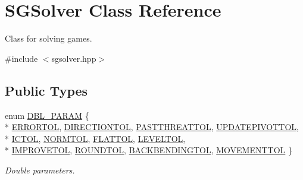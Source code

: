 \hypertarget{class_s_g_solver}{\section{S\+G\+Solver Class Reference}
\label{class_s_g_solver}
}


Class for solving games.  




{\ttfamily \#include $<$sgsolver.\+hpp$>$}

\subsection*{Public Types}
\begin{DoxyCompactItemize}
\item 
enum \hyperlink{class_s_g_solver_a8c5a3d3ffb0b8344e24da63ea0b3e791}{D\+B\+L\+\_\+\+P\+A\+R\+A\+M} \{ \\*
\hyperlink{class_s_g_solver_a8c5a3d3ffb0b8344e24da63ea0b3e791aa95cd65c0e0c61f23336299c31c21e23}{E\+R\+R\+O\+R\+T\+O\+L}, 
\hyperlink{class_s_g_solver_a8c5a3d3ffb0b8344e24da63ea0b3e791afb966ddafded880b3a150ffbf665c0b9}{D\+I\+R\+E\+C\+T\+I\+O\+N\+T\+O\+L}, 
\hyperlink{class_s_g_solver_a8c5a3d3ffb0b8344e24da63ea0b3e791a0bf9e7be2aa199b09eb7fcfb5a604e84}{P\+A\+S\+T\+T\+H\+R\+E\+A\+T\+T\+O\+L}, 
\hyperlink{class_s_g_solver_a8c5a3d3ffb0b8344e24da63ea0b3e791a26c3df797839d75535ea3525159c9687}{U\+P\+D\+A\+T\+E\+P\+I\+V\+O\+T\+T\+O\+L}, 
\\*
\hyperlink{class_s_g_solver_a8c5a3d3ffb0b8344e24da63ea0b3e791acfc1ac35dad7908dd182b395c0256a17}{I\+C\+T\+O\+L}, 
\hyperlink{class_s_g_solver_a8c5a3d3ffb0b8344e24da63ea0b3e791a7df7080f029ef0b59493dee9b020c8b8}{N\+O\+R\+M\+T\+O\+L}, 
\hyperlink{class_s_g_solver_a8c5a3d3ffb0b8344e24da63ea0b3e791a0469d84b8d9a560cfdb25b6c43229815}{F\+L\+A\+T\+T\+O\+L}, 
\hyperlink{class_s_g_solver_a8c5a3d3ffb0b8344e24da63ea0b3e791ace6ad6763f68822c5809a3a4247b9b42}{L\+E\+V\+E\+L\+T\+O\+L}, 
\\*
\hyperlink{class_s_g_solver_a8c5a3d3ffb0b8344e24da63ea0b3e791a0c8efa0b4f9ba181f9daab92b678f19f}{I\+M\+P\+R\+O\+V\+E\+T\+O\+L}, 
\hyperlink{class_s_g_solver_a8c5a3d3ffb0b8344e24da63ea0b3e791ac2ba4831d6d6282dfab90aa3fdd5a825}{R\+O\+U\+N\+D\+T\+O\+L}, 
\hyperlink{class_s_g_solver_a8c5a3d3ffb0b8344e24da63ea0b3e791a46e8819cb9376cc65094dffdebbe1b86}{B\+A\+C\+K\+B\+E\+N\+D\+I\+N\+G\+T\+O\+L}, 
\hyperlink{class_s_g_solver_a8c5a3d3ffb0b8344e24da63ea0b3e791a1be0b2f10efa1591ab0c08b53b23df72}{M\+O\+V\+E\+M\+E\+N\+T\+T\+O\+L}
 \}
\begin{DoxyCompactList}\small\item\em Double parameters. \end{DoxyCompactList}\item 

\end{DoxyCompactItemize}
